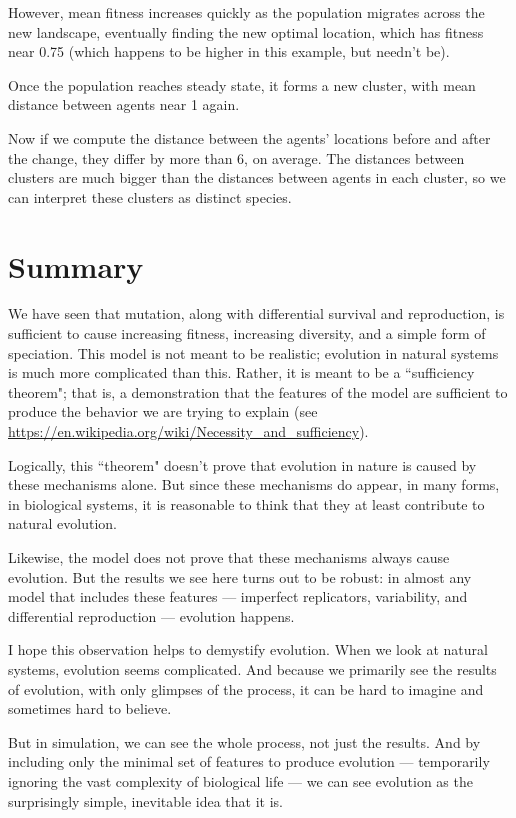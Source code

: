 \documentclass[12pt]{book}
\theoremstyle{exercise}
\begin{document}
However, mean fitness increases quickly as the population migrates across the new landscape, eventually finding the new optimal location, which has fitness near 0.75 (which happens to be higher in this example, but needn't be).

Once the population reaches steady state, it forms a new cluster, with mean distance between agents near 1 again.

Now if we compute the distance between the agents' locations before and after the change, they differ by more than 6, on average.  The distances between clusters are much bigger than the distances between agents in each cluster, so we can interpret these clusters as distinct species. 


\section{Summary}

We have seen that mutation, along with differential survival and reproduction, is sufficient to cause increasing fitness, increasing diversity, and a simple form of speciation.  This model is not meant to be realistic; evolution in natural systems is much more complicated than this.  Rather, it is meant to be a ``sufficiency theorem"; that is, a demonstration that the features of the model are sufficient to produce the behavior we are trying to explain (see \url{https://en.wikipedia.org/wiki/Necessity_and_sufficiency}).

Logically, this ``theorem" doesn't prove that evolution in nature is caused by these mechanisms alone.  But since these mechanisms do appear, in many forms, in biological systems, it is reasonable to think that they at least contribute to natural evolution.

Likewise, the model does not prove that these mechanisms always cause evolution.  But the results we see here turns out to be robust: in almost any model that includes these features --- imperfect replicators, variability, and differential reproduction --- evolution happens.

I hope this observation helps to demystify evolution.  When we look at natural systems, evolution seems complicated.  And because we primarily see the results of evolution, with only glimpses of the process, it can be hard to imagine and sometimes hard to believe.

But in simulation, we can see the whole process, not just the results.  And by including only the minimal set of features to produce evolution --- temporarily ignoring the vast complexity of biological life --- we can see evolution as the surprisingly simple, inevitable idea that it is.
\end{document}
